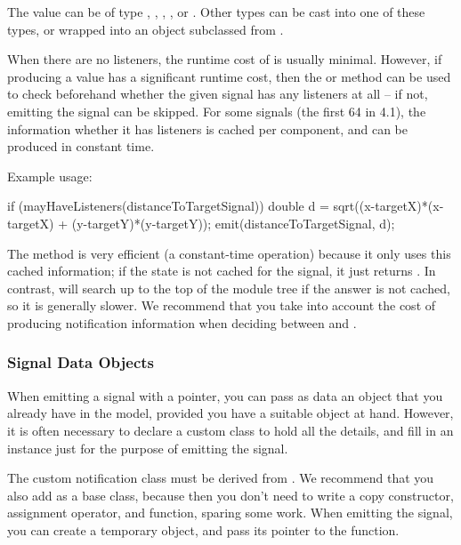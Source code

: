 The value can be of type , , ,
, or . Other types can be cast into
one of these types, or wrapped into an object subclassed from .

When there are no listeners, the runtime cost of  is usually minimal.
However, if producing a value has a significant runtime cost, then the
 or  method can be used
to check beforehand whether the given signal has any listeners at all --
if not, emitting the signal can be skipped. For some signals (the first 64
in {\opp} 4.1), the information whether it has listeners is cached per
component, and can be produced in constant time.

Example usage:

\begin{cpp}
if (mayHaveListeners(distanceToTargetSignal))
{
    double d = sqrt((x-targetX)*(x-targetX) + (y-targetY)*(y-targetY));
    emit(distanceToTargetSignal, d);
}
\end{cpp}

The  method is very efficient (a constant-time
operation) because it only uses this cached information; if the state is
not cached for the signal, it just returns . In contrast,
 will search up to the top of the module tree if
the answer is not cached, so it is generally slower. We recommend that
you take into account the cost of producing notification information when
deciding between  and .


\subsubsection{Signal Data Objects}

When emitting a signal with a  pointer, you can pass as data
an object that you already have in the model, provided you have a suitable
object at hand. However, it is often necessary to declare a custom class
to hold all the details, and fill in an instance just for the purpose of
emitting the signal.

The custom notification class must be derived from .
We recommend that you also add  as a base class, because
then you don't need to write a copy constructor, assignment operator, and
 function, sparing some work. When emitting the signal, you
can create a temporary object, and pass its pointer to the 
function.

